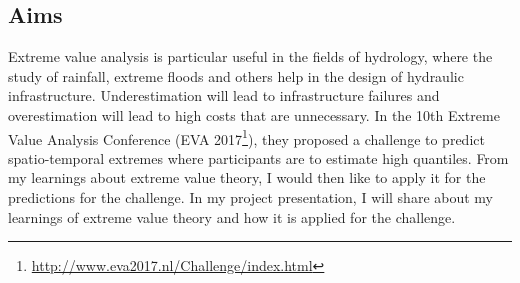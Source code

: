 \documentclass[a4paper,10pt]{article}
\theoremstyle{definition}
\begin{document}
\subsection*{Aims}
Extreme value analysis is particular useful in the fields of hydrology, where the study of rainfall, extreme floods and others help in the design of hydraulic infrastructure. Underestimation will lead to infrastructure failures and overestimation will lead to high costs that are unnecessary. In the 10th Extreme Value Analysis Conference (EVA 2017\footnote{\url{http://www.eva2017.nl/Challenge/index.html}}), they proposed a challenge to predict spatio-temporal extremes where participants are to estimate high quantiles. From my learnings about extreme value theory, I would then like to apply it for the predictions for the challenge. In my project presentation, I will share about my learnings of extreme value theory and how it is applied for the challenge.

\end{document}
